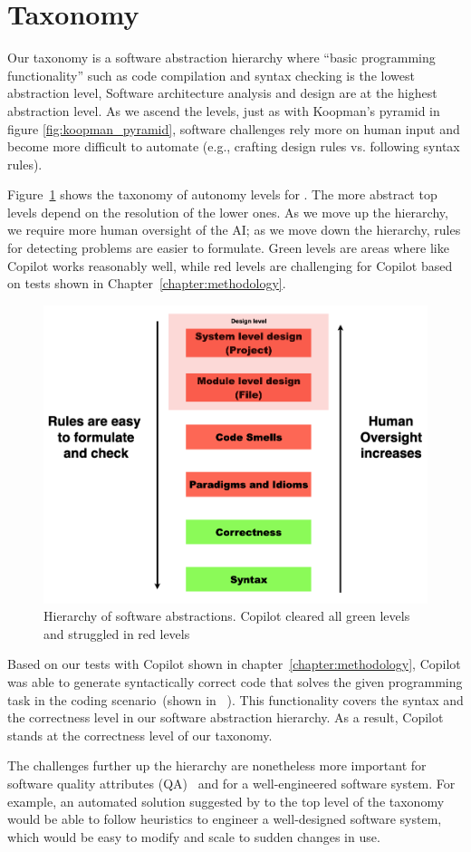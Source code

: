 \section{Taxonomy}
\label{taxonomy}
Our taxonomy is a software abstraction hierarchy where ``basic programming functionality'' such as code compilation and syntax checking is the lowest abstraction level,
Software architecture analysis and design are at the highest abstraction level.
As we ascend the levels, just as with Koopman's pyramid in figure \ref{fig:koopman_pyramid}, 
software challenges rely more on human input and become more difficult to automate (e.g., crafting design rules vs. following syntax rules).

Figure~\ref{fig:taxonomy} shows the taxonomy of autonomy levels for \cct{}. The more abstract top levels depend on the resolution of the lower ones. As we move up the hierarchy, we require more human oversight of the AI; as we move down the hierarchy, rules for detecting problems are easier to formulate. Green levels are areas where \cct{} like Copilot works reasonably well, while red levels are challenging for Copilot based on tests shown in Chapter~\ref{chapter:methodology}.

\begin{figure}[hbt!]
    \centering
    \includegraphics[width=\linewidth]{Figures/taxonomy.png}
    \caption{Hierarchy of software abstractions. Copilot cleared all green levels and struggled in red levels}
    \label{fig:taxonomy}
\end{figure}

Based on our tests with Copilot shown in chapter~\ref{chapter:methodology}, Copilot was able to generate syntactically correct code that solves the given programming task in the coding scenario~(shown in ~\repl{}).
This functionality covers the syntax and the correctness level in our software abstraction hierarchy.
As a result, Copilot stands at the correctness level of our taxonomy. 

The challenges further up the hierarchy are nonetheless more important for software quality attributes (QA)~\cite{Ernst2017} and for a well-engineered software system.
For example, an automated solution suggested by \cct{} to the top level of the taxonomy would be able to follow heuristics to engineer a well-designed software system, which would be easy to modify and scale to sudden changes in use.